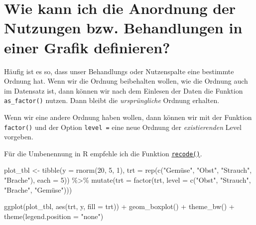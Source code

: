 \documentclass[
  letterpaper,
]{scrbook}
\newenvironment{Shaded}{\begin{snugshade}}{\end{snugshade}}
\newcommand{\AttributeTok}[1]{\textcolor[rgb]{0.40,0.45,0.13}{#1}}
\newcommand{\DecValTok}[1]{\textcolor[rgb]{0.68,0.00,0.00}{#1}}
\newcommand{\FunctionTok}[1]{\textcolor[rgb]{0.28,0.35,0.67}{#1}}
\newcommand{\NormalTok}[1]{\textcolor[rgb]{0.00,0.23,0.31}{#1}}
\newcommand{\OtherTok}[1]{\textcolor[rgb]{0.00,0.23,0.31}{#1}}
\newcommand{\SpecialCharTok}[1]{\textcolor[rgb]{0.37,0.37,0.37}{#1}}
\newcommand{\StringTok}[1]{\textcolor[rgb]{0.13,0.47,0.30}{#1}}
\begin{document}
\hypertarget{sec-order-x-names}{%
\section{Wie kann ich die Anordnung der Nutzungen bzw. Behandlungen in
einer Grafik definieren?}\label{sec-order-x-names}}

Häufig ist es so, dass unser Behandlungs oder Nutzenspalte eine
bestimmte Ordnung hat. Wenn wir die Ordnung beibehalten wollen, wie die
Ordnung auch im Datensatz ist, dann können wir nach dem Einlesen der
Daten die Funktion \texttt{as\_factor()} nutzen. Dann bleibt die
\emph{ursprüngliche} Ordnung erhalten.

Wenn wir eine andere Ordnung haben wollen, dann können wir mit der
Funktion \texttt{factor()} und der Option \texttt{level\ =} eine neue
Ordnung der \emph{existierenden} Level vorgeben.

Für die Umbenennung in R empfehle ich die Funktion
\href{https://dplyr.tidyverse.org/reference/recode.html}{\texttt{recode()}}.

\begin{Shaded}
\begin{Highlighting}[]
\NormalTok{plot\_tbl }\OtherTok{\textless{}{-}} \FunctionTok{tibble}\NormalTok{(}\AttributeTok{y =} \FunctionTok{rnorm}\NormalTok{(}\DecValTok{20}\NormalTok{, }\DecValTok{5}\NormalTok{, }\DecValTok{1}\NormalTok{),}
                   \AttributeTok{trt =} \FunctionTok{rep}\NormalTok{(}\FunctionTok{c}\NormalTok{(}\StringTok{"Gemüse"}\NormalTok{, }\StringTok{"Obst"}\NormalTok{, }\StringTok{"Strauch"}\NormalTok{, }\StringTok{"Brache"}\NormalTok{), }
                             \AttributeTok{each =} \DecValTok{5}\NormalTok{)) }\SpecialCharTok{\%\textgreater{}\%} 
  \FunctionTok{mutate}\NormalTok{(}\AttributeTok{trt =}  \FunctionTok{factor}\NormalTok{(trt, }\AttributeTok{level =} \FunctionTok{c}\NormalTok{(}\StringTok{"Obst"}\NormalTok{, }\StringTok{"Strauch"}\NormalTok{, }\StringTok{"Brache"}\NormalTok{, }\StringTok{"Gemüse"}\NormalTok{)))}

\FunctionTok{ggplot}\NormalTok{(plot\_tbl, }\FunctionTok{aes}\NormalTok{(trt, y, }\AttributeTok{fill =}\NormalTok{ trt)) }\SpecialCharTok{+}
  \FunctionTok{geom\_boxplot}\NormalTok{() }\SpecialCharTok{+}
  \FunctionTok{theme\_bw}\NormalTok{() }\SpecialCharTok{+}
  \FunctionTok{theme}\NormalTok{(}\AttributeTok{legend.position =} \StringTok{"none"}\NormalTok{)}
\end{Highlighting}
\end{Shaded}
\end{document}
